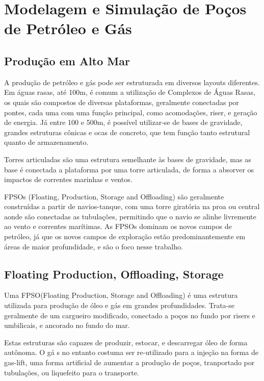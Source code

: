 

\chapter{Modelagem e Simulação de Poços de Petróleo e Gás} \label{chap:2}


\section{Produção em Alto Mar}

A produção de petróleo e gás pode ser estruturada em diversos layouts diferentes.
% 
Em águas rasas, até 100m, é comum a utilização de Complexos de Águas Rasas, os quais são compostos de diversas plataformas, geralmente conectadas por pontes, cada uma com uma função principal, como acomodações, riser, e geração de energia.
%
Já entre 100 e 500m, é possível utilizar-se de bases de gravidade, grandes estruturas cônicas e ocas de concreto, que tem função tanto estrutural quanto de armazenamento. 
%

Torres articuladas são uma estrutura semelhante às bases de gravidade, mas as base é conectada a plataforma por uma torre articulada, de forma a absorver os impactos de correntes marinhas e ventos.
%

FPSOs (Floating, Production, Storage and Offloading) são geralmente construídas a partir de navios-tanque, com uma torre giratória na proa ou central aonde são conectadas as tubulações, permitindo que o navio se alinhe livremente ao vento e correntes marítimas. 
%
As FPSOs dominam os novos campos de petróleo, já que os novos campos de exploração estão predominantemente em áreas de maior profundidade, e são o foco nesse trabalho.

\section{Floating Production, Offloading, Storage}
Uma FPSO(Floating Production, Storage and Offloading) é uma estrutura utilizada para produção de óleo e gás em grandes profundidades. Trata-se geralmente de um cargueiro modificado, conectado a poços no fundo por risers e umbilicais, e ancorado no fundo do mar.

Estas estruturas são capazes de produzir, estocar, e descarregar óleo de forma autônoma. O gá
s no entanto costuma ser re-utilizado para a injeção na forma de gas-lift, uma forma artificial de aumentar a produção de poços, tranportado por tubulações, ou liquefeito para o transporte.

